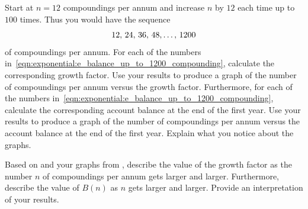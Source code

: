 \documentclass[a4paper,oneside,12pt]{article}
\begin{document}
\begin{problem}
\begin{packedenum}
  \item\label{subprob:exponential:e_balance_up_to_1200_compounding}
    Start at $n = 12$ compoundings per annum and increase $n$ by $12$
    each time up to $100$ times.  Thus you would have the sequence
    \begin{equation}
    \label{eqn:exponential:e_balance_up_to_1200_compounding}
    {{12},\,{24}},\, {{36},\, {48}}, \dots,\, {1200}
    \end{equation}
    of compoundings per annum.  For each of the numbers
    in~\eqref{eqn:exponential:e_balance_up_to_1200_compounding},
    calculate the corresponding growth factor.  Use your results to
    produce a graph of the number of compoundings per annum versus the
    growth factor.  Furthermore, for each of the numbers
    in~\eqref{eqn:exponential:e_balance_up_to_1200_compounding},
    calculate the corresponding account balance at the end of the
    first year.  Use your results to produce a graph of the number of
    compoundings per annum versus the account balance at the end of
    the first year.  Explain what you notice about the graphs.

  \item\label{subprob:exponential:e_balance_limit_of_growth_factor_balance}
    Based on
     and
    your graphs
    from ,
    describe the value of the growth factor as the number $n$ of
    compoundings per annum gets larger and larger.  Furthermore,
    describe the value of $B(n)$ as $n$ gets larger and larger.
    Provide an interpretation of your results.


\end{packedenum}
\end{problem}
\end{document}
